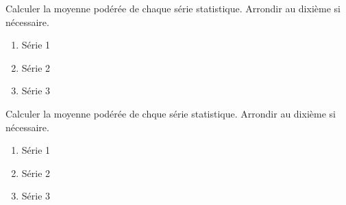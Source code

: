 \begin{exercice*}
    Calculer la moyenne podérée de chaque série statistique. Arrondir au dixième si nécessaire.
    \begin{enumerate}
        \item Série 1\par\smallskip
        \smallskip
        \item Série 2\par\smallskip
        \smallskip
        \item Série 3\par\smallskip
        \smallskip
    \end{enumerate}
\end{exercice*}
\begin{corrige}
    Calculer la moyenne podérée de chque série statistique. Arrondir au dixième si nécessaire.
    \begin{enumerate}
        \item Série 1\par\smallskip
        \par\smallskip
        \textcolor{red}{
        }
        \smallskip
        \item Série 2\par\smallskip
        \par\smallskip
        \textcolor{red}{
        }
    \end{enumerate}
        \Coupe
    \begin{enumerate}
        \setcounter{enumi}{2}
        \item Série 3\par\smallskip
        \hspace*{-10mm}
        \par\smallskip
        \textcolor{red}{
        }

    \end{enumerate}
\end{corrige}

